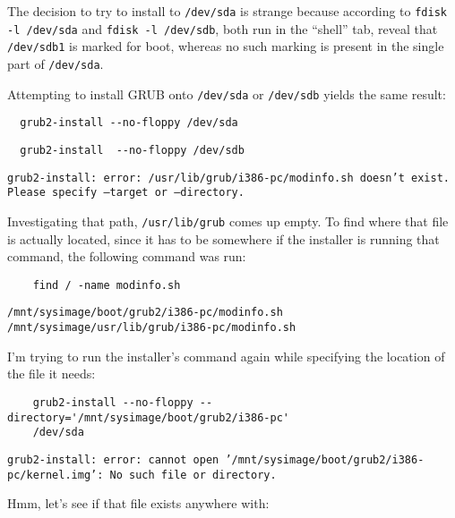 \documentclass[12pt]{article}
\begin{document}
The decision to try to install to {\tt /dev/sda} is strange because according to
{\tt fdisk -l /dev/sda} and {\tt fdisk -l /dev/sdb}, both run in the ``shell''
tab, reveal that {\tt /dev/sdb1} is marked for boot, whereas no such marking is
present in the single part of {\tt /dev/sda}.

\qq Attempting to install GRUB onto {\tt /dev/sda} or {\tt /dev/sdb} yields the
same result:

\begin{tcolorbox}[colback=white, colframe=black]
\begin{verbatim}
  grub2-install --no-floppy /dev/sda 
\end{verbatim}
\begin{verbatim}
  grub2-install  --no-floppy /dev/sdb 
\end{verbatim}
\tcblower
{\tt grub2-install: error: /usr/lib/grub/i386-pc/modinfo.sh doesn't
  exist. Please specify --target or --directory.} 
\end{tcolorbox}

Investigating that path, {\tt /usr/lib/grub} comes up empty. To
find where that file is actually located, since it has to be somewhere if the
installer is running that command, the following command was run:

\begin{tcolorbox}[colback=white, colframe=black]
  \begin{verbatim}
    find / -name modinfo.sh
  \end{verbatim}
  \tcblower
  {\tt /mnt/sysimage/boot/grub2/i386-pc/modinfo.sh}\\

  {\tt /mnt/sysimage/usr/lib/grub/i386-pc/modinfo.sh}
\end{tcolorbox}

\qq I'm trying to run the installer's command again while specifying the
location of the file it needs: 

\begin{tcolorbox}[colback=white, colframe=black]
  \begin{verbatim}
    grub2-install --no-floppy --directory='/mnt/sysimage/boot/grub2/i386-pc'
    /dev/sda
  \end{verbatim}
  \tcblower
  {\tt grub2-install: error: cannot open
    '/mnt/sysimage/boot/grub2/i386-pc/kernel.img': No such file or
    directory.}
\end{tcolorbox}

Hmm, let's see if that file exists anywhere with: 
\end{document}
